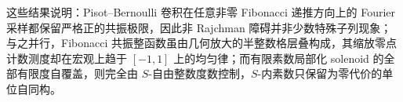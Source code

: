 \noindent
这些结果说明：Pisot--Bernoulli 卷积在任意非零 Fibonacci 递推方向上的 Fourier 采样都保留严格正的共振极限，因此非 Rajchman 障碍并非少数特殊子列现象；与之并行，Fibonacci 共振整函数虽由几何放大的半整数格层叠构成，其缩放零点计数测度却在宏观上趋于 \([-1,1]\) 上的均匀律；而有限素数局部化 solenoid 的全部有限度自覆盖，则完全由 \(S\)-自由整数度数控制，\(S\)-内素数只保留为零代价的单位自同构。

\endinput
